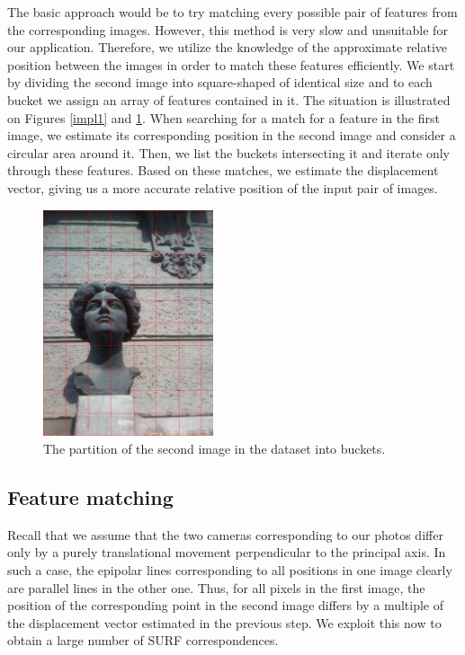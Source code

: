 The basic approach would be to try matching every possible pair of features from the corresponding images. 
However, this method is very slow and unsuitable for our application. 
Therefore, we utilize the knowledge of the approximate relative position between the images in order to match these features efficiently.
We start by dividing the second image into square-shaped  of identical size and to each bucket we assign an array of features contained in it.
The situation is illustrated on Figures \ref{impl1} and \ref{emabuckets}.
When searching for a match for a feature in the first image, we estimate its corresponding position in the second image and consider a circular area around it. 
Then, we list the buckets intersecting it and iterate only through these features. 
Based on these matches, we estimate the displacement vector, giving us a more accurate relative position of the input pair of images.

\begin{figure}[h]
\centering
\includegraphics[width=5cm]{img/ema_buckets.png}
\caption{The partition of the second image in the dataset into buckets.}
\label{emabuckets}
\end{figure} 


\subsection{Feature matching}

Recall that we assume that the two cameras corresponding to our photos differ only by a purely translational movement perpendicular to the principal axis.
In such a case, the epipolar lines corresponding to all positions in one image clearly are parallel lines in the other one. 
Thus, for all pixels in the first image, the position of the corresponding point in the second image differs by a multiple of the displacement vector estimated in the previous step. 
We exploit this now to obtain a large number of SURF correspondences. 

